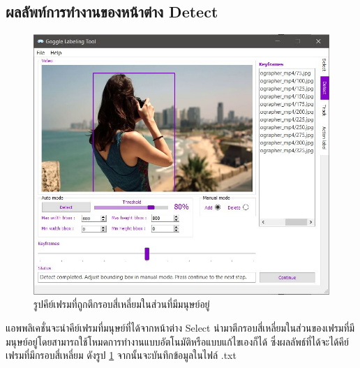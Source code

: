 \subsection*{ผลลัพท์การทำงานของหน้าต่าง Detect}
\begin{figure}[!ht]
  \centering
    \includegraphics[scale=0.60]{chapter4/images/Result/result_select4.jpg}
    \caption{รูปคีย์เฟรมที่ถูกตีกรอบสี่เหลี่ยมในส่วนที่มีมนุษย์อยู่}
    \label{fig:result_detect}
\end{figure}
\clearpage
แอพพลิเคชั่นจะนำคีย์เฟรมที่มนุษย์ที่ได้จากหน้าต่าง Select นำมาตีกรอบสี่เหลี่ยมในส่วนของเฟรมที่มีมนุษย์อยู่โดยสามารถใช้โหมดการทำงานแบบอัตโนมัติหรือแบบแก้ไขเองก็ได้ ซึ่งผลลัพธ์ที่ได้จะได้คีย์เฟรมที่มีกรอบสี่เหลี่ยม ดังรูป \ref{fig:result_detect} จากนั้นจะบันทึกข้อมูลในไฟล์ .txt 

